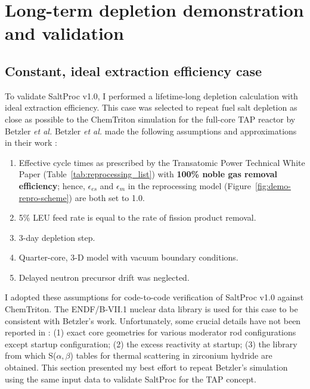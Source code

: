\section{Long-term depletion demonstration and validation}\label{sec:long-term}
\subsection{Constant, ideal extraction efficiency case}\label{sec:ben-valid}
To validate SaltProc v1.0, I performed a lifetime-long depletion calculation 
with ideal extraction efficiency. This case was selected to repeat fuel salt 
depletion as close as possible to the ChemTriton simulation for the full-core 
\gls{TAP} reactor by Betzler \emph{et al.} \cite{betzler_assessment_2017-1}  
Betzler \emph{et al.} made the following assumptions and approximations in 
their work \cite{betzler_assessment_2017-1}:
\begin{enumerate}[label=(\alph*), noitemsep, topsep=0pt]	
	\item Effective cycle times as prescribed by the Transatomic Power 
	Technical White Paper \cite{transatomic_power_corporation_technical_2016} 
	(Table~\ref{tab:reprocessing_list}) with \textbf{100\% noble 
	gas removal efficiency}; hence, $\epsilon_{es}$ and $\epsilon_m$ in the
	reprocessing model (Figure~\ref{fig:demo-repro-scheme}) are both set to 
	1.0.
	\item 5\% \gls{LEU} feed rate is equal to the rate of fission product 
	removal.
	\item 3-day depletion step.
	\item Quarter-core, 3-D model with vacuum boundary conditions.
	\item Delayed neutron precursor drift was neglected.
\end{enumerate}

I adopted these assumptions for code-to-code verification of SaltProc v1.0 
against ChemTriton. The ENDF/B-VII.1 \cite{chadwick_endf/b-vii.1_2011} nuclear 
data library is used for this case to be consistent with Betzler's work.
Unfortunately, some crucial details have not been reported in 
\cite{betzler_assessment_2017-1}: (1) exact core geometries for various 
moderator rod configurations except startup configuration; (2) the excess 
reactivity at startup; (3) the library from which S($\alpha, \beta$) tables 
for thermal scattering in zirconium hydride are obtained. This section 
presented my best effort to repeat Betzler's simulation using the same input 
data to validate SaltProc for the \gls{TAP} concept.


